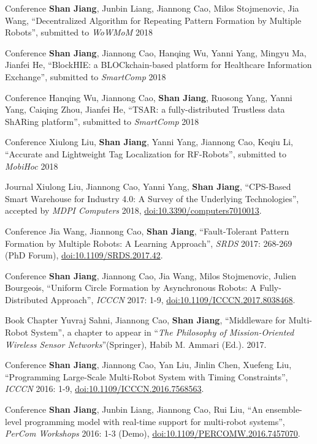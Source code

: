 \documentclass[11pt, a4paper]{awesome-cv} %
\begin{document}
\begin{cvpublications}
\cvpublication
{Conference}
{{\bf Shan Jiang}, Junbin Liang, Jiannong Cao, Milos Stojmenovic, Jia Wang, ``Decentralized Algorithm for Repeating Pattern Formation by Multiple Robots'', submitted to {\em WoWMoM} 2018}

\cvpublication
{Conference}
{{\bf Shan Jiang}, Jiannong Cao, Hanqing Wu, Yanni Yang, Mingyu Ma, Jianfei He, ``BlockHIE: a BLOCkchain-based platform for Healthcare Information Exchange'', submitted to {\em SmartComp} 2018} 

\cvpublication
{Conference}
{Hanqing Wu, Jiannong Cao, {\bf Shan Jiang}, Ruosong Yang, Yanni Yang, Caiqing Zhou, Jianfei He, ``TSAR: a fully-distributed Trustless data ShARing platform'', submitted to {\em SmartComp} 2018}

\cvpublication
{Conference}
{Xiulong Liu, {\bf Shan Jiang}, Yanni Yang, Jiannong Cao, Keqiu Li, ``Accurate and Lightweight Tag Localization for RF-Robots'', submitted to {\em MobiHoc} 2018}

\cvpublication
{Journal}
{Xiulong Liu, Jiannong Cao, Yanni Yang, {\bf Shan Jiang}, ``CPS-Based Smart Warehouse for Industry 4.0: A Survey of the Underlying Technologies'', accepted by {\em MDPI Computers} 2018, \href{https://doi.org/10.3390/computers7010013}{doi:10.3390/computers7010013}.} 

\cvpublication
{Conference}
{Jia Wang, Jiannong Cao, {\bf Shan Jiang}, ``Fault-Tolerant Pattern Formation by Multiple Robots: A Learning Approach'', {\em SRDS} 2017: 268-269 (PhD Forum), \href{https://doi.org/10.1109/SRDS.2017.42}{doi:10.1109/SRDS.2017.42}.}

\cvpublication
{Conference}
{{\bf Shan Jiang}, Jiannong Cao, Jia Wang, Milos Stojmenovic, Julien Bourgeois, ``Uniform Circle Formation by Asynchronous Robots: A Fully-Distributed Approach'', {\em ICCCN} 2017: 1-9, \href{https://doi.org/10.1109/ICCCN.2017.8038468}{doi:10.1109/ICCCN.2017.8038468}.}

\cvpublication
{Book Chapter}
{Yuvraj Sahni, Jiannong Cao, {\bf Shan Jiang}, ``Middleware for Multi-Robot System'', a chapter to appear in ``{\em The Philosophy of Mission-Oriented Wireless Sensor Networks}''(Springer), Habib M. Ammari (Ed.). 2017.}

\cvpublication
{Conference}
{{\bf Shan Jiang}, Jiannong Cao, Yan Liu, Jinlin Chen, Xuefeng Liu, ``Programming Large-Scale Multi-Robot System with Timing Constraints'', {\em ICCCN} 2016: 1-9, \href{https://doi.org/10.1109/ICCCN.2016.7568563}{doi:10.1109/ICCCN.2016.7568563}.}

\cvpublication
{Conference}
{{\bf Shan Jiang}, Junbin Liang, Jiannong Cao, Rui Liu, ``An ensemble-level programming model with real-time support for multi-robot systems'', {\em PerCom Workshops} 2016: 1-3 (Demo), \href{https://doi.org/10.1109/PERCOMW.2016.7457070}{doi:10.1109/PERCOMW.2016.7457070}.}
\end{cvpublications}
\end{document}
